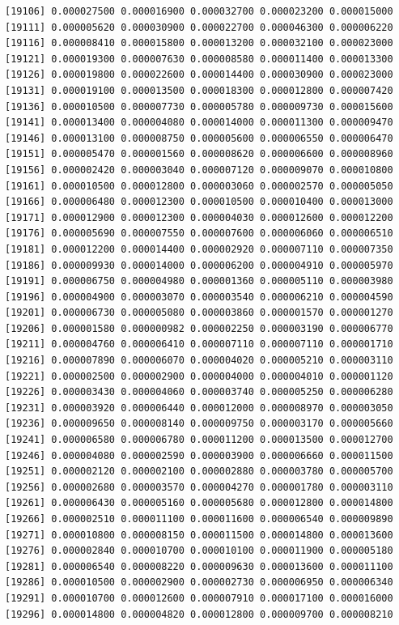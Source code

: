 \documentclass[]{article}
\begin{document}
\begin{verbatim}
[19106] 0.000027500 0.000016900 0.000032700 0.000023200 0.000015000
[19111] 0.000005620 0.000030900 0.000022700 0.000046300 0.000006220
[19116] 0.000008410 0.000015800 0.000013200 0.000032100 0.000023000
[19121] 0.000019300 0.000007630 0.000008580 0.000011400 0.000013300
[19126] 0.000019800 0.000022600 0.000014400 0.000030900 0.000023000
[19131] 0.000019100 0.000013500 0.000018300 0.000012800 0.000007420
[19136] 0.000010500 0.000007730 0.000005780 0.000009730 0.000015600
[19141] 0.000013400 0.000004080 0.000014000 0.000011300 0.000009470
[19146] 0.000013100 0.000008750 0.000005600 0.000006550 0.000006470
[19151] 0.000005470 0.000001560 0.000008620 0.000006600 0.000008960
[19156] 0.000002420 0.000003040 0.000007120 0.000009070 0.000010800
[19161] 0.000010500 0.000012800 0.000003060 0.000002570 0.000005050
[19166] 0.000006480 0.000012300 0.000010500 0.000010400 0.000013000
[19171] 0.000012900 0.000012300 0.000004030 0.000012600 0.000012200
[19176] 0.000005690 0.000007550 0.000007600 0.000006060 0.000006510
[19181] 0.000012200 0.000014400 0.000002920 0.000007110 0.000007350
[19186] 0.000009930 0.000014000 0.000006200 0.000004910 0.000005970
[19191] 0.000006750 0.000004980 0.000001360 0.000005110 0.000003980
[19196] 0.000004900 0.000003070 0.000003540 0.000006210 0.000004590
[19201] 0.000006730 0.000005080 0.000003860 0.000001570 0.000001270
[19206] 0.000001580 0.000000982 0.000002250 0.000003190 0.000006770
[19211] 0.000004760 0.000006410 0.000007110 0.000007110 0.000001710
[19216] 0.000007890 0.000006070 0.000004020 0.000005210 0.000003110
[19221] 0.000002500 0.000002900 0.000004000 0.000004010 0.000001120
[19226] 0.000003430 0.000004060 0.000003740 0.000005250 0.000006280
[19231] 0.000003920 0.000006440 0.000012000 0.000008970 0.000003050
[19236] 0.000009650 0.000008140 0.000009750 0.000003170 0.000005660
[19241] 0.000006580 0.000006780 0.000011200 0.000013500 0.000012700
[19246] 0.000004080 0.000002590 0.000003900 0.000006660 0.000011500
[19251] 0.000002120 0.000002100 0.000002880 0.000003780 0.000005700
[19256] 0.000002680 0.000003570 0.000004270 0.000001780 0.000003110
[19261] 0.000006430 0.000005160 0.000005680 0.000012800 0.000014800
[19266] 0.000002510 0.000011100 0.000011600 0.000006540 0.000009890
[19271] 0.000010800 0.000008150 0.000011500 0.000014800 0.000013600
[19276] 0.000002840 0.000010700 0.000010100 0.000011900 0.000005180
[19281] 0.000006540 0.000008220 0.000009630 0.000013600 0.000011100
[19286] 0.000010500 0.000002900 0.000002730 0.000006950 0.000006340
[19291] 0.000010700 0.000012600 0.000007910 0.000017100 0.000016000
[19296] 0.000014800 0.000004820 0.000012800 0.000009700 0.000008210

\end{verbatim}
\end{document}
